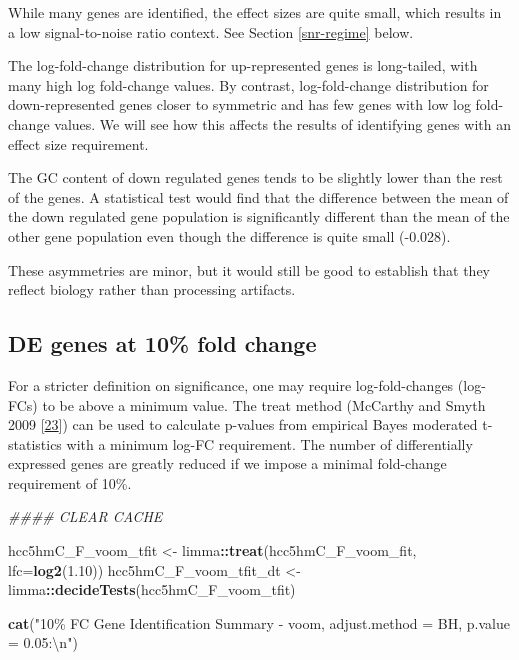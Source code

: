 \documentclass[
]{book}
\newenvironment{Shaded}{\begin{snugshade}}{\end{snugshade}}
\newcommand{\CharTok}[1]{\textcolor[rgb]{0.31,0.60,0.02}{#1}}
\newcommand{\CommentTok}[1]{\textcolor[rgb]{0.56,0.35,0.01}{\textit{#1}}}
\newcommand{\DataTypeTok}[1]{\textcolor[rgb]{0.13,0.29,0.53}{#1}}
\newcommand{\FloatTok}[1]{\textcolor[rgb]{0.00,0.00,0.81}{#1}}
\newcommand{\KeywordTok}[1]{\textcolor[rgb]{0.13,0.29,0.53}{\textbf{#1}}}
\newcommand{\NormalTok}[1]{#1}
\newcommand{\OperatorTok}[1]{\textcolor[rgb]{0.81,0.36,0.00}{\textbf{#1}}}
\newcommand{\StringTok}[1]{\textcolor[rgb]{0.31,0.60,0.02}{#1}}
\begin{document}
While many genes are identified, the effect sizes are quite small,
which results in a low signal-to-noise ratio context. See
Section \ref{snr-regime} below.

The log-fold-change distribution for up-represented genes is long-tailed,
with many high log fold-change values.
By contrast, log-fold-change distribution for down-represented genes
closer to symmetric and has few genes with low log fold-change values.
We will see how this affects the results of identifying genes with
an effect size requirement.

The GC content of down regulated genes tends to be slightly lower than the
rest of the genes. A statistical test would find that the difference
between the mean of the down regulated gene population is significantly different
than the mean of the other gene population even though the difference is
quite small
(-0.028).

These asymmetries are minor, but it would still be good to establish that
they reflect biology rather than processing artifacts.

\hypertarget{de-genes-at-10-fold-change}{%
\subsection*{DE genes at 10\% fold change}\label{de-genes-at-10-fold-change}}

For a stricter definition on significance, one may require log-fold-changes
(log-FCs) to be above a minimum value. The treat method
(McCarthy and Smyth 2009 {[}\protect\hyperlink{ref-McCarthy:2009aa}{23}{]}) can be used to calculate p-values
from empirical Bayes moderated t-statistics with a minimum log-FC requirement.
The number of differentially expressed genes are greatly reduced if we
impose a minimal fold-change requirement of 10\%.

\begin{Shaded}
\begin{Highlighting}[]
\CommentTok{\#\#\#\# CLEAR CACHE}

\NormalTok{hcc5hmC\_F\_voom\_tfit <{-}}\StringTok{ }\NormalTok{limma}\OperatorTok{::}\KeywordTok{treat}\NormalTok{(hcc5hmC\_F\_voom\_fit, }\DataTypeTok{lfc=}\KeywordTok{log2}\NormalTok{(}\FloatTok{1.10}\NormalTok{))}
\NormalTok{hcc5hmC\_F\_voom\_tfit\_dt <{-}}\StringTok{ }\NormalTok{limma}\OperatorTok{::}\KeywordTok{decideTests}\NormalTok{(hcc5hmC\_F\_voom\_tfit)}

\KeywordTok{cat}\NormalTok{(}\StringTok{"10\% FC Gene Identification Summary {-} voom, adjust.method = BH, p.value = 0.05:}\CharTok{\textbackslash{}n}\StringTok{"}\NormalTok{)}
\end{Highlighting}
\end{Shaded}
\end{document}
